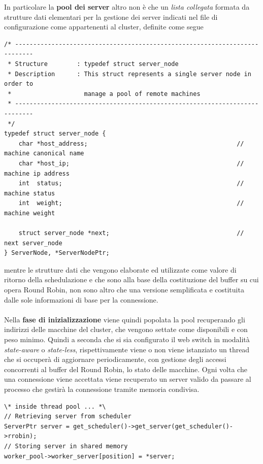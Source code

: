 \documentclass[italian]{tktltiki2}
\begin{document}
In particolare la \textbf{pool dei server} altro non è che un \emph{lista collegata} formata da strutture dati elementari per la gestione dei server indicati nel file di configurazione come appartenenti al cluster, definite come segue
\begin{lstlisting}
/* ---------------------------------------------------------------------------
 * Structure        : typedef struct server_node
 * Description      : This struct represents a single server node in order to
 *                    manage a pool of remote machines
 * ---------------------------------------------------------------------------
 */
typedef struct server_node {
    char *host_address;                                         // machine canonical name
    char *host_ip;                                              // machine ip address
    int  status;                                                // machine status
    int  weight;                                                // machine weight

    struct server_node *next;                                   // next server_node
} ServerNode, *ServerNodePtr;

\end{lstlisting}
mentre le strutture dati che vengono elaborate ed utilizzate come valore di ritorno della schedulazione e che sono alla base della costituzione del buffer su cui opera Round Robin, non sono altro che una versione semplificata e costituita dalle sole informazioni di base per la connessione. \\\\
Nella \textbf{fase di inizializzazione} viene quindi popolata la pool recuperando gli indirizzi delle macchine del cluster, che vengono settate come disponibili e con peso minimo. Quindi a seconda che si sia configurato il web switch in modalità \emph{state-aware} o \emph{state-less}, rispettivamente viene o non viene istanziato un thread che si occuperà di aggiornare periodicamente, con gestione degli accessi concorrenti al buffer del Round Robin, lo stato delle macchine. Ogni volta che una connessione viene accettata viene recuperato un server valido da passare al processo che gestirà la connessione tramite memoria condivisa.
\begin{lstlisting}
\* inside thread pool ... *\
// Retrieving server from scheduler
ServerPtr server = get_scheduler()->get_server(get_scheduler()->rrobin);
// Storing server in shared memory
worker_pool->worker_server[position] = *server;
	
\end{lstlisting}
\end{document}
